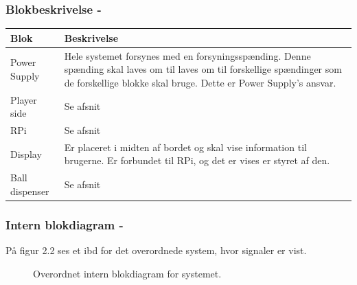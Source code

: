 \documentclass[Arkitektur/System_main.tex]{subfiles}
\begin{document}
\subsubsection{Blokbeskrivelse - }

\begin{table}[H]
\begin{tabular}{L{0.2\columnwidth}|L{0.8\columnwidth}}
\hline
\textbf{Blok} & \textbf{Beskrivelse} \\ \hline
Power Supply & Hele systemet forsynes med en forsyningsspænding. Denne spænding skal laves om til laves om til forskellige spændinger som de forskellige blokke skal bruge. Dette er Power Supply's ansvar.\\ \hline
Player side & Se afsnit \textit{} \\ \hline
RPi & Se afsnit \textit{}  \\ \hline
Display & Er placeret i midten af bordet og skal vise information til brugerne. Er forbundet til RPi, og det er vises er styret af den. \\ \hline
Ball dispenser & Se afsnit \textit{}   \\ \hline
\end{tabular}
\end{table}

\subsubsection{Intern blokdiagram - }

På figur 2.2 ses et ibd for det overordnede system, hvor signaler er vist.

\begin{figure}[H]
    \centering
    \caption{Overordnet intern blokdiagram for systemet.}
    \label{fig:overall_hardware_ibd}
\end{figure}
\end{document}
